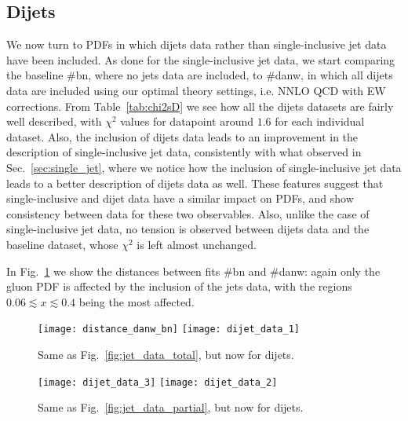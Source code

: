 \subsection{Dijets}
We now turn to PDFs in which dijets data rather than single-inclusive jet data have been included.
As done for the single-inclusive jet data, we start comparing the baseline \#bn, where no jets data are included,
to \#danw, in which all dijets data are included using our optimal theory settings, i.e. NNLO QCD with EW corrections.
From Table~\ref{tab:chi2sD} we see how all the dijets datasets are fairly well described, with $\chi^2$ values for datapoint
around $1.6$ for each individual dataset. Also, the inclusion of dijets data leads to an improvement in the description
of single-inclusive jet data, consistently with what observed in Sec.~\ref{sec:single_jet}, where 
we notice how the inclusion of single-inclusive jet data leads to a better description of dijets data as well.
These features suggest that single-inclusive and dijet data have a similar impact on PDFs, and show consistency
between data for these two observables. 
%
Also, unlike the case of single-inclusive jet data, no tension is observed between dijets data and the baseline dataset,
whose $\chi^2$ is left almost unchanged.

%
In Fig.~\ref{fig:dijet_data_total} we show the distances between fits \#bn and \#danw: again only
the gluon PDF is affected by the inclusion of the jets data, with the regions $0.06\lesssim x \lesssim 0.4$
being the most affected.  


\begin{figure}[!t]
    \centering
    \texttt{[image: distance\_danw\_bn]}
    \texttt{[image: dijet\_data\_1]}\\
    \caption{Same as Fig.~\ref{fig:jet_data_total}, but now for dijets.}
    \label{fig:dijet_data_total}
\end{figure}
    \begin{figure}[!t]
    \centering
    \texttt{[image: dijet\_data\_3]}
    \texttt{[image: dijet\_data\_2]}
    \caption{Same as Fig.~\ref{fig:jet_data_partial}, but now for dijets.}
    \label{fig:dijet_data_partial}
\end{figure}




